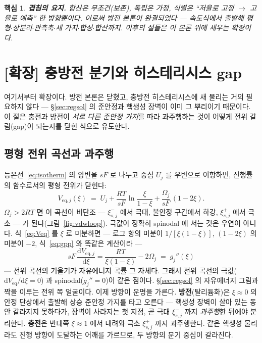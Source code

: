 \documentclass[11pt,a4paper]{article}
\newtheorem*{keybox}{핵심}
\newcommand{\dd}{\mathrm{d}}
\newcommand{\eq}{\mathrm{eq}}
\begin{document}
\begin{keybox}
\textbf{겹침의 요지.} 합산은 무조건(보존), 독립은 가정, 식별은 ``저율로 고정 $\to$ 고율로 예측'' 한
방향뿐이다. 이로써 방전 본론이 완결되었다 — 속도식에서 출발해 평형$\cdot$상분리$\cdot$관측축$\cdot$세
가지$\cdot$합성$\cdot$합산까지. 이후의 절들은 이 본론 위에 세우는 확장이다.
\end{keybox}

\section{[확장] 충방전 분기와 히스테리시스 gap}\label{sec:hys}
여기서부터 확장이다. 방전 본론은 닫혔고, 충방전 히스테리시스에 새 물리는 거의 필요하지 않다 —
\S\ref{sec:regsol} 의 준안정과 핵생성 장벽이 이미 그 뿌리이기 때문이다. 이 절은 충전과 방전이 \emph{서로
다른 준안정 가지}를 따라 과주행하는 것이 어떻게 전위 갈림(gap)이 되는지를 닫힌 식으로 유도한다.

\subsection{평형 전위 곡선과 과주행}
등온선~\eqref{eq:isotherm} 의 양변을 $sF$ 로 나누고 중심 $U_j$ 를 우변으로 이항하면, 진행률의
함수로서의 평형 전위가 닫힌다:
\begin{equation}
V_{\eq,j}(\xi)\;=\;U_j+\frac{RT}{sF}\ln\frac{\xi}{1-\xi}+\frac{\Omega_j}{sF}\,(1-2\xi).
\label{eq:Veq}
\end{equation}
$\Omega_j>2RT$ 면 이 곡선이 비단조 — $\xi_{s,j}^-$ 에서 극대, 불안정 구간에서 하강, $\xi_{s,j}^+$ 에서
극소 — 가 된다(그림~\ref{fig:vdwloop}). 극값이 정확히 spinodal 에 서는 것은 우연이 아니다.
식~\eqref{eq:Veq} 를 $\xi$ 로 미분하면 — 로그 항의 미분이 $1/[\xi(1-\xi)]$, $(1-2\xi)$ 의
미분이 $-2$, 식~\eqref{eq:gpp} 와 똑같은 계산이라 —
\begin{equation}
sF\,\frac{\dd V_{\eq,j}}{\dd\xi}
=\frac{RT}{\xi(1-\xi)}-2\Omega_j
\;=\;g_j''(\xi)
\label{eq:veqslope}
\end{equation}
— 전위 곡선의 기울기가 자유에너지 곡률 그 자체다. 그래서 전위 곡선의 극값($\dd V_{\eq}/\dd\xi=0$)
과 spinodal($g_j''=0$)이 같은 점이다. \S\ref{sec:regsol} 의 자유에너지 그림과 짝을 이루는 전위 쪽
얼굴이다. 이제 방향이 운명을 가른다. \textbf{방전}(탈리튬화)은 $\xi\approx0$ 의 안정 단상에서 출발해
상승 준안정 가지를 타고 오른다 — 핵생성 장벽이 살아 있는 동안 갈라지지 못하다가, 장벽이 사라지는 첫 지점,
곧 극대 $\xi_{s,j}^-$ 까지 \emph{과주행}한 뒤에야 분리한다. \textbf{충전}은 반대쪽 $\xi\approx1$ 에서
내려와 극소 $\xi_{s,j}^+$ 까지 과주행한다. 같은 핵생성 물리라도 진행 방향이 도달하는 어깨를 가르므로, 두
방향의 분기 중심이 갈라진다.
\end{document}
